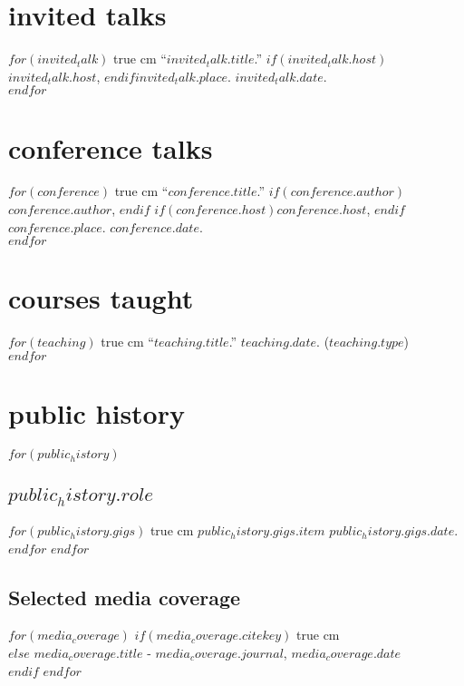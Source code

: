 \documentclass[11pt, letter]{article}
\def\ind{\hangindent=1 true cm\hangafter=1 \noindent}
\begin{document}
\section{invited talks}

$for(invited_talk)$
\ind ``$invited_talk.title$.'' $if(invited_talk.host)$$invited_talk.host$, $endif$$invited_talk.place$. $invited_talk.date$.\\[.15cm]
$endfor$


\section{conference talks}

$for(conference)$
\ind ``$conference.title$.''
$if(conference.author)$$conference.author$, $endif$
$if(conference.host)$$conference.host$, $endif$
$conference.place$.
$conference.date$.\\[.15cm]
$endfor$

\section{courses taught}

$for(teaching)$
\ind ``$teaching.title$.'' $teaching.date$. ($teaching.type$)\\[.15cm]
$endfor$


\section{public history}

$for(public_history)$
\subsection{$public_history.role$}
$for(public_history.gigs)$
\ind $public_history.gigs.item$ $public_history.gigs.date$.\\[.15cm]
$endfor$
$endfor$
\subsection{Selected media coverage}

$for(media_coverage)$
$if(media_coverage.citekey)$
\ind {}\\
$else$
$media_coverage.title$ -  \textit{$media_coverage.journal$}, $media_coverage.date$\\[.15cm]
$endif$
$endfor$
\end{document}
